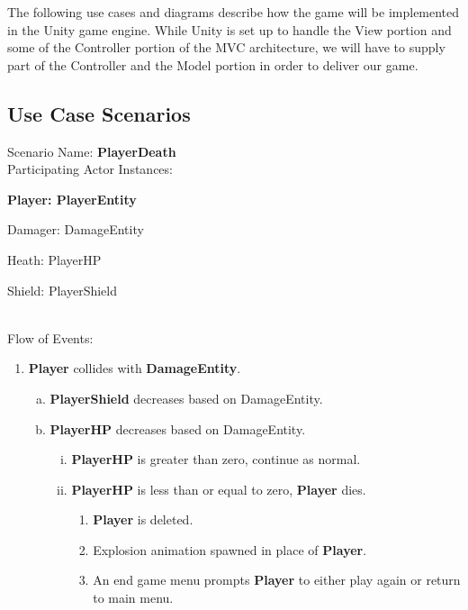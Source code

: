 \documentclass[12pt]{article}       %
\def\hs{\hspace{15pt}}
\begin{document}
\hs The following use cases and diagrams describe how the game will be implemented in the Unity game engine. While Unity is set up to handle the View portion and some of the Controller portion of the MVC architecture, we will have to supply part of the Controller and the Model portion in order to deliver our game.

\subsection{Use Case Scenarios} 
Scenario Name: {\bf PlayerDeath} \\
Participating Actor Instances:        \hspace{46pt} {\bf Player: PlayerEntity

					          \hspace{2.6 in}   Damager: DamageEntity 

					          \hspace{2.6in}    Heath: PlayerHP

						\hspace{2.6in}   Shield: PlayerShield} \vspace{10pt}  \\ 
Flow of Events: 
\begin{enumerate} 
\item {\bf Player }collides with {\bf DamageEntity}.
      \begin{enumerate}[a.]
       \item {\bf PlayerShield} decreases based on DamageEntity. 
       \item {\bf PlayerHP} decreases based on DamageEntity. 
                \begin{enumerate}[i.]
                 \item {\bf PlayerHP} is greater than zero, continue as normal.
                 \item{\bf PlayerHP} is less than or equal to zero, {\bf Player} dies.
                      \begin{enumerate}[1.]
                	\item {\bf Player} is deleted.
                	\item Explosion animation spawned in place of {\bf Player}.
		\item An end game menu prompts {\bf Player} to either play again or return to main menu.
		 \end{enumerate}
                \end{enumerate}
        \end{enumerate}
\end{enumerate}
\end{document}
